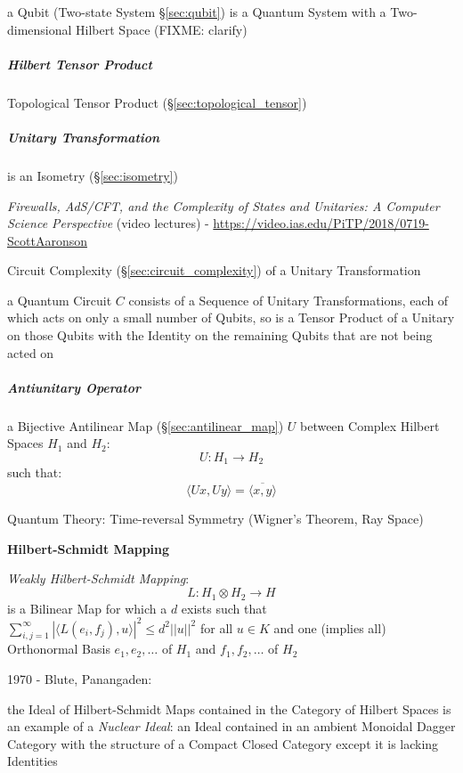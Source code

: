 \fist a Qubit (Two-state System \S\ref{sec:qubit}) is a Quantum System with a
Two-dimensional Hilbert Space (FIXME: clarify)



\subparagraph{Hilbert Tensor Product}\label{sec:hilbert_tensor}\hfill

Topological Tensor Product (\S\ref{sec:topological_tensor})



\subparagraph{Unitary Transformation}\label{sec:unitary_transformation}\hfill

is an Isometry (\S\ref{sec:isometry})

\emph{Firewalls, AdS/CFT, and the Complexity of States and Unitaries: A Computer
  Science Perspective}
(video lectures)
-
\url{https://video.ias.edu/PiTP/2018/0719-ScottAaronson}

Circuit Complexity (\S\ref{sec:circuit_complexity}) of a
Unitary Transformation

a Quantum Circuit $C$ consists of a Sequence of Unitary Transformations, each of
which acts on only a small number of Qubits, so is a Tensor Product of a Unitary
on those Qubits with the Identity on the remaining Qubits that are not being
acted on



\subparagraph{Antiunitary Operator}\label{sec:antiunitary_operator}\hfill

a Bijective Antilinear Map (\S\ref{sec:antilinear_map}) $U$ between Complex
Hilbert Spaces $H_1$ and $H_2$:
\[
  U : H_1 \rightarrow H_2
\]
such that:
\[
  \langle{Ux,Uy}\rangle = \overline{\langle{x,y}\rangle}
\]

Quantum Theory: Time-reversal Symmetry (Wigner's Theorem, Ray Space) %



\textbf{Hilbert-Schmidt Mapping}

\emph{Weakly Hilbert-Schmidt Mapping}:
\[
  L : H_1 \otimes H_2 \rightarrow H
\]
is a Bilinear Map for which a $d$ exists such that
$\sum_{i,j=1}^\infty | \langle L(e_i,f_j), u \rangle |^2 \leq d^2
||u||^2$ for all $u \in K$ and one (implies all) Orthonormal Basis
$e_1, e_2, \ldots$ of $H_1$ and $f_1, f_2, \ldots$ of $H_2$


1970 - Blute, Panangaden:

the Ideal of Hilbert-Schmidt Maps contained in the Category of Hilbert
Spaces is an example of a \emph{Nuclear Ideal}: an Ideal contained in
an ambient Monoidal Dagger Category with the structure of a Compact
Closed Category except it is lacking Identities



